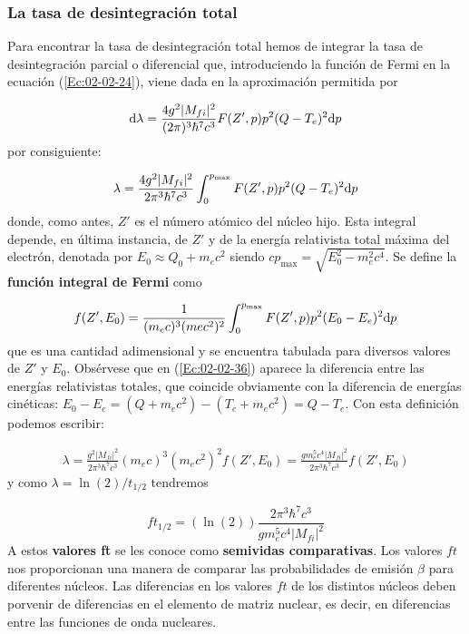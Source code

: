 \subsubsection{La tasa de desintegración total}

Para encontrar la tasa de desintegración total hemos de integrar la tasa de desintegración parcial o diferencial que, introduciendo la función de Fermi en la ecuación (\ref{Ec:02-02-24}), viene dada en la aproximación permitida por 

\begin{eqnarray}
	\mathrm{d} \lambda = \frac{4g^2 |M_{fi}|^2}{(2\pi)^3 \hbar^7 c^3} F(Z',p)p^2 (Q-T_e)^2 \mathrm{d} p
\end{eqnarray}
por consiguiente:

\begin{eqnarray}
	\lambda= \frac{4g^2 |M_{fi}|^2}{2\pi^3 \hbar^7 c^3} \int_0^{p_{\max}} F(Z',p)p^2 (Q-T_e)^2 \mathrm{d} p
\end{eqnarray}
donde, como antes, $Z'$ es el número atómico del núcleo hijo. Esta integral depende, en última instancia, de $Z'$ y de la energía relativista total máxima del electrón, denotada por $E_0 \approx Q_0 + m_e c^2$ siendo $cp_{\max}=\sqrt{E_0^2 - m_e^2c^4}$. Se define la \textbf{función integral de Fermi} como

\begin{eqnarray}
	f(Z',E_0) = \frac{1}{(m_ec)^3(mec^2)^2} \int_0^{p_{\max}} F(Z',p) p^2 (E_0-E_e)^2 \mathrm{d} p\label{Ec:02-02-36}
\end{eqnarray} 
que es una cantidad adimensional y se encuentra tabulada para diversos valores de $Z'$ y $E_0$. Obsérvese que en (\ref{Ec:02-02-36}) aparece la diferencia entre las energías relativistas totales, que coincide obviamente con la diferencia de energías cinéticas: $E_0 - E_e = (Q+m_ec^2)-(T_e+m_ec^2)=Q-T_e$. Con esta definición podemos escribir:

\begin{eqnarray}
	\lambda = \frac{g^2 |M_{fi}|^2}{2\pi^3 \hbar^7 c^3} (m_ec)^3 (m_ec^2)^2 f(Z',E_0) =\frac{g m_e^5 c^4 |M_{fi}|^2}{2\pi^3 \hbar^7 c^3} f(Z',E_0) 
\end{eqnarray}
y como $\lambda= \ln(2)/t_{1/2}$ tendremos

\begin{equation}
	ft_{1/2} = (\ln(2)) \frac{2\pi^3 \hbar^7 c^3}{g m_e^5 c^4 |M_{fi}|^2}
\end{equation}
A estos \textbf{valores ft} se les conoce como \textbf{semividas comparativas}. Los valores $ft$ nos proporcionan una manera de comparar las probabilidades de emisión $\beta$ para diferentes núcleos. Las diferencias en los valores $ft$ de los distintos núcleos deben porvenir de diferencias en el elemento de matriz nuclear, es decir, en diferencias entre las funciones de onda nucleares.

